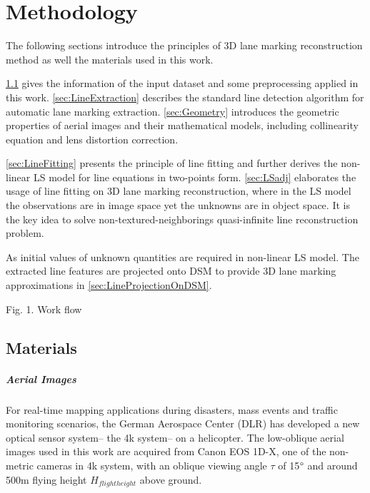 
\chapter{Methodology}
\label{chap:k2}

The following sections introduce the principles of 3D lane marking reconstruction method as well the materials used in this work.%

\cref{sec:Materials} gives the information of the input dataset and some preprocessing applied in this work. \cref{sec:LineExtraction} describes the standard line detection algorithm for automatic lane marking extraction. \cref{sec:Geometry} introduces the geometric properties of aerial images and their mathematical models, including collinearity equation and lens distortion correction.

\cref{sec:LineFitting} presents the principle of line fitting and further derives the non-linear LS model for line equations in two-points form. \cref{sec:LSadj} elaborates the usage of line fitting on 3D lane marking reconstruction, where in the LS model the observations are in image space yet the unknowns are in object space. It is the key idea to solve non-textured-neighborings quasi-infinite line reconstruction problem.

As initial values of unknown quantities are required in non-linear LS model. The extracted line features are projected onto DSM to provide 3D lane marking approximations in \cref{sec:LineProjectionOnDSM}.

Fig. 1. Work flow

\clearpage

\section{Materials}
\label{sec:Materials}


\paragraph{Aerial Images}

For real-time mapping applications during disasters, mass events and traffic monitoring scenarios, the German Aerospace Center (DLR) has developed a new optical sensor system-- the 4k system-- on a helicopter. %
The low-oblique aerial images used in this work are acquired from Canon EOS 1D-X, one of the non-metric cameras in 4k system, with an oblique viewing angle $\tau$ of 15$\degree$ and around 500m flying height $H_{flight height}$ above ground.

